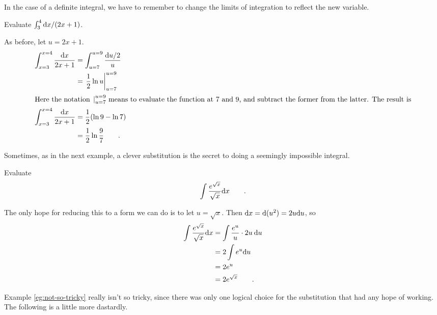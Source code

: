 In the case of a definite integral, we have to remember to change the limits of integration
to reflect the new variable.

\begin{eg}
\egquestion Evaluate $\int_3^4 \textup{d} x/(2x+1)$.

\eganswer As before, let $u=2x+1$.
\begin{align*}
  \int_{x=3}^{x=4} \frac{\textup{d} x}{2x+1}   &= \int_{u=7}^{u=9} \frac{\textup{d} u/2}{u} \\
       &= \left.\frac{1}{2}\ln u\right|_{u=7}^{u=9} \\
\intertext{Here the notation $\left.\right|_{u=7}^{u=9}$ means to evaluate the function at
7 and 9, and subtract the former from the latter. The result is}
  \int_{x=3}^{x=4} \frac{\textup{d} x}{2x+1}  &= \frac{1}{2}(\ln 9-\ln 7) \\
            &=\frac{1}{2}\ln\frac{9}{7} \qquad .
\end{align*}
\end{eg}

Sometimes, as in the next example, a clever substitution is the secret to doing a
seemingly impossible integral.

\begin{eg}\label{eg:not-so-tricky}
\egquestion Evaluate
\begin{equation*}
  \int \frac{e^{\sqrt x}}{\sqrt x} \textup{d} x \qquad .
\end{equation*}

\eganswer The only hope for reducing this to a form we can do is to let
$u=\sqrt x$. Then $\textup{d} x=\textup{d}(u^2)=2u\textup{d} u$, so
\begin{align*}
  \int \frac{e^{\sqrt x}}{\sqrt x} \textup{d} x &=   \int \frac{e^u}{u} \cdot 2u\:\textup{d} u \\
             &= 2 \int e^u \textup{d} u \\
             &= 2e^u \\
             &= 2e^{\sqrt{x}} \qquad .
\end{align*}
\end{eg}

Example \ref{eg:not-so-tricky} really isn't so tricky, since there was only one logical
choice for the substitution that had any hope of working. The following is a little more
dastardly.

